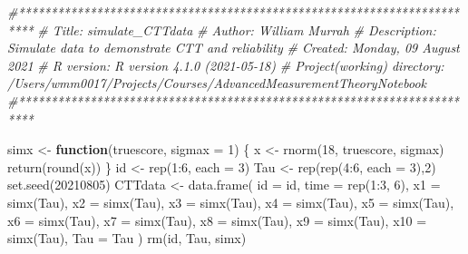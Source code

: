 \documentclass[
]{book}
\newenvironment{Shaded}{\begin{snugshade}}{\end{snugshade}}
\newcommand{\AttributeTok}[1]{\textcolor[rgb]{0.77,0.63,0.00}{#1}}
\newcommand{\CommentTok}[1]{\textcolor[rgb]{0.56,0.35,0.01}{\textit{#1}}}
\newcommand{\ControlFlowTok}[1]{\textcolor[rgb]{0.13,0.29,0.53}{\textbf{#1}}}
\newcommand{\DecValTok}[1]{\textcolor[rgb]{0.00,0.00,0.81}{#1}}
\newcommand{\FunctionTok}[1]{\textcolor[rgb]{0.00,0.00,0.00}{#1}}
\newcommand{\NormalTok}[1]{#1}
\newcommand{\OtherTok}[1]{\textcolor[rgb]{0.56,0.35,0.01}{#1}}
\newcommand{\SpecialCharTok}[1]{\textcolor[rgb]{0.00,0.00,0.00}{#1}}
\begin{document}
\begin{Shaded}
\begin{Highlighting}[]
\CommentTok{\#************************************************************************}
\CommentTok{\# Title: simulate\_CTTdata}
\CommentTok{\# Author: William Murrah}
\CommentTok{\# Description: Simulate data to demonstrate CTT and reliability}
\CommentTok{\# Created: Monday, 09 August 2021}
\CommentTok{\# R version: R version 4.1.0 (2021{-}05{-}18)}
\CommentTok{\# Project(working) directory: /Users/wmm0017/Projects/Courses/AdvancedMeasurementTheoryNotebook}
\CommentTok{\#************************************************************************}

\NormalTok{simx }\OtherTok{\textless{}{-}} \ControlFlowTok{function}\NormalTok{(truescore, }\AttributeTok{sigmax =} \DecValTok{1}\NormalTok{) \{}
\NormalTok{  x }\OtherTok{\textless{}{-}} \FunctionTok{rnorm}\NormalTok{(}\DecValTok{18}\NormalTok{, truescore, sigmax)}
  \FunctionTok{return}\NormalTok{(}\FunctionTok{round}\NormalTok{(x))}
\NormalTok{\}}
\NormalTok{id }\OtherTok{\textless{}{-}} \FunctionTok{rep}\NormalTok{(}\DecValTok{1}\SpecialCharTok{:}\DecValTok{6}\NormalTok{, }\AttributeTok{each =} \DecValTok{3}\NormalTok{)}
\NormalTok{Tau }\OtherTok{\textless{}{-}} \FunctionTok{rep}\NormalTok{(}\FunctionTok{rep}\NormalTok{(}\DecValTok{4}\SpecialCharTok{:}\DecValTok{6}\NormalTok{, }\AttributeTok{each =} \DecValTok{3}\NormalTok{),}\DecValTok{2}\NormalTok{)}
\FunctionTok{set.seed}\NormalTok{(}\DecValTok{20210805}\NormalTok{)}
\NormalTok{CTTdata }\OtherTok{\textless{}{-}} \FunctionTok{data.frame}\NormalTok{(}
  \AttributeTok{id =}\NormalTok{ id,}
  \AttributeTok{time =} \FunctionTok{rep}\NormalTok{(}\DecValTok{1}\SpecialCharTok{:}\DecValTok{3}\NormalTok{, }\DecValTok{6}\NormalTok{),}
  \AttributeTok{x1 =} \FunctionTok{simx}\NormalTok{(Tau),}
  \AttributeTok{x2 =} \FunctionTok{simx}\NormalTok{(Tau),}
  \AttributeTok{x3 =} \FunctionTok{simx}\NormalTok{(Tau),}
  \AttributeTok{x4 =} \FunctionTok{simx}\NormalTok{(Tau),}
  \AttributeTok{x5 =} \FunctionTok{simx}\NormalTok{(Tau),}
  \AttributeTok{x6 =} \FunctionTok{simx}\NormalTok{(Tau),}
  \AttributeTok{x7 =} \FunctionTok{simx}\NormalTok{(Tau),}
  \AttributeTok{x8 =} \FunctionTok{simx}\NormalTok{(Tau),}
  \AttributeTok{x9 =} \FunctionTok{simx}\NormalTok{(Tau),}
  \AttributeTok{x10 =} \FunctionTok{simx}\NormalTok{(Tau),}
  \AttributeTok{Tau =}\NormalTok{ Tau}
\NormalTok{)}
\FunctionTok{rm}\NormalTok{(id, Tau, simx)}
\end{Highlighting}
\end{Shaded}
\end{document}
